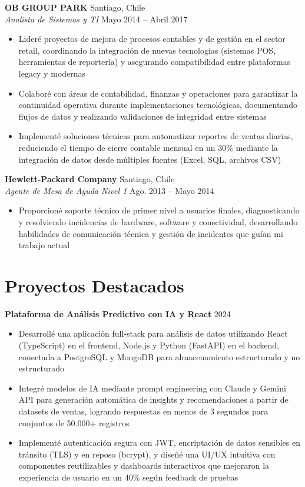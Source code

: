 \documentclass[11pt,letterpaper]{article}
\begin{document}
\vspace{2pt}
\textbf{OB GROUP PARK} \hfill Santiago, Chile\\
\textit{Analista de Sistemas y TI} \hfill Mayo 2014 – Abril 2017
\begin{itemize}
  \item Lideré proyectos de mejora de procesos contables y de gestión en el sector retail, coordinando la integración de nuevas tecnologías (sistemas POS, herramientas de reportería) y asegurando compatibilidad entre plataformas legacy y modernas
  \item Colaboré con áreas de contabilidad, finanzas y operaciones para garantizar la continuidad operativa durante implementaciones tecnológicas, documentando flujos de datos y realizando validaciones de integridad entre sistemas
  \item Implementé soluciones técnicas para automatizar reportes de ventas diarias, reduciendo el tiempo de cierre contable mensual en un 30\% mediante la integración de datos desde múltiples fuentes (Excel, SQL, archivos CSV)
\end{itemize}
\vspace{2pt}
\textbf{Hewlett-Packard Company} \hfill Santiago, Chile\\
\textit{Agente de Mesa de Ayuda Nivel 1} \hfill Ago. 2013 – Mayo 2014
\begin{itemize}
  \item Proporcioné soporte técnico de primer nivel a usuarios finales, diagnosticando y resolviendo incidencias de hardware, software y conectividad, desarrollando habilidades de comunicación técnica y gestión de incidentes que guían mi trabajo actual
\end{itemize}

\section{Proyectos Destacados}

\textbf{Plataforma de Análisis Predictivo con IA y React} \hfill 2024
\begin{itemize}
  \item Desarrollé una aplicación full-stack para análisis de datos utilizando React (TypeScript) en el frontend, Node.js y Python (FastAPI) en el backend, conectada a PostgreSQL y MongoDB para almacenamiento estructurado y no estructurado
  \item Integré modelos de IA mediante prompt engineering con Claude y Gemini API para generación automática de insights y recomendaciones a partir de datasets de ventas, logrando respuestas en menos de 3 segundos para conjuntos de 50.000+ registros
  \item Implementé autenticación segura con JWT, encriptación de datos sensibles en tránsito (TLS) y en reposo (bcrypt), y diseñé una UI/UX intuitiva con componentes reutilizables y dashboards interactivos que mejoraron la experiencia de usuario en un 40\% según feedback de pruebas
\end{itemize}
\end{document}

